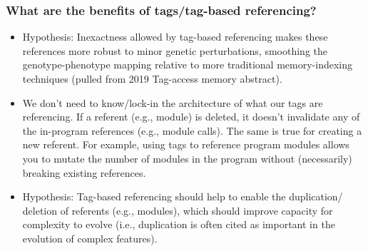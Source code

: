 \subsubsection{What are the benefits of tags/tag-based referencing?}

\begin{itemize}
  \item Hypothesis: Inexactness allowed by tag-based referencing makes these references
        more robust to minor genetic perturbations, smoothing the genotype-phenotype
        mapping relative to more traditional memory-indexing techniques (pulled from
        2019 Tag-access memory abstract).
  \item We don't need to know/lock-in the architecture of what our tags are referencing.
        If a referent (e.g., module) is deleted, it doesn't invalidate any of the
        in-program references (e.g., module calls). The same is true for creating
        a new referent. For example, using tags to reference program modules allows
        you to mutate the number of modules in the program without (necessarily)
        breaking existing references.
  \item Hypothesis: Tag-based referencing should help to enable the duplication/
        deletion of referents (e.g., modules), which should improve capacity for
        complexity to evolve (i.e., duplication is often cited as important in the
        evolution of complex features).
\end{itemize}
